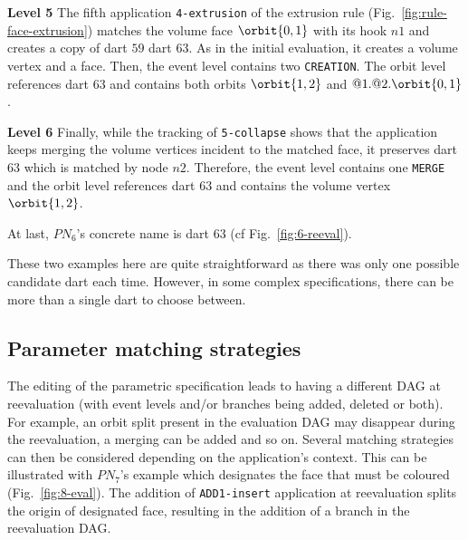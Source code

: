 \textbf{Level 5} The fifth application \texttt{4-extrusion} of the extrusion
rule (Fig.~\ref{fig:rule-face-extrusion}) matches the volume face $\orbit{0,1}$
with its hook $n1$ and creates a copy of dart $59$ dart $63$. As in the initial
evaluation, it creates a volume vertex and a face. Then, the event level
contains two \texttt{CREATION}. The orbit level references dart $63$ and
contains both orbits $\orbit{1,2}$ and $@1.@2.\orbit{0,1}$.

\textbf{Level 6} Finally, while the tracking of \texttt{5-collapse} shows that
the application keeps merging the volume vertices incident to the matched face,
it preserves dart $63$ which is matched by node $n2$. Therefore, the event level
contains one \texttt{MERGE} and the orbit level references dart $63$ and
contains the volume vertex $\orbit{1,2}$.

At last, $PN_6$'s concrete name is dart $63$ (cf Fig.~\ref{fig:6-reeval}). %

These two examples here are quite straightforward as there was only one possible candidate dart each time. %
However, in some com\-plex specifications, there can be more than a single dart to choose bet\-ween.

\subsection{Parameter matching strategies}

The editing of the parametric specification leads to having a dif\-fe\-rent DAG at reevaluation (with event levels and/or branches being added, deleted or both). %
For example, an orbit split present in the evaluation DAG may disappear during the reevaluation, a merging can be added and so on. %
Several matching strategies can then be %
considered depending on the application's context. %
This can be il\-lus\-tra\-ted with $PN_7$'s example which designates the face that must be coloured (Fig.~\ref{fig:8-eval}). %
The addition of \texttt{ADD1-insert} application at reevaluation splits the origin of designated face, resulting in the addition of a branch in the reevaluation DAG. 

